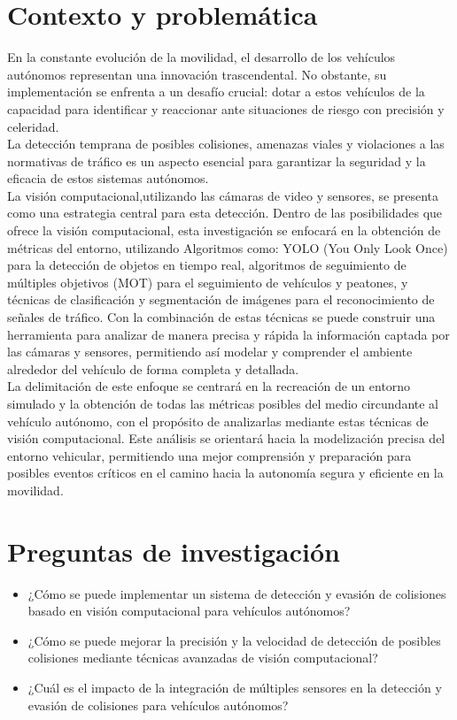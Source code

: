 \documentclass[10pt,letterpaper,final]{article}
\begin{document}
    \section*{Contexto y problemática}
    \noindent En la constante evolución de la movilidad, el desarrollo de los vehículos autónomos representan una innovación trascendental.
    No obstante, su implementación se enfrenta a un desafío crucial: dotar a estos vehículos de la capacidad para identificar
    y reaccionar ante situaciones de riesgo con precisión y celeridad. \\
    La detección temprana de posibles colisiones, amenazas viales y violaciones a las normativas de tráfico
    es un aspecto esencial para garantizar la seguridad y la eficacia de estos sistemas autónomos.\\
    La visión computacional,utilizando las cámaras de video y sensores, se presenta como una estrategia central para esta detección.
    Dentro de las posibilidades que ofrece la visión computacional, esta investigación se enfocará en la obtención de métricas del entorno,
    utilizando Algoritmos como:
    YOLO (You Only Look Once) para la detección de objetos en tiempo real,
    algoritmos de seguimiento de múltiples objetivos (MOT) para el seguimiento de vehículos y peatones, y
    técnicas de clasificación y segmentación de imágenes para el reconocimiento de señales de tráfico.
    Con la combinación de estas técnicas se puede construir una herramienta para analizar de manera precisa y rápida
    la información captada por las cámaras y sensores, permitiendo así modelar y comprender el ambiente alrededor del vehículo de forma completa y detallada.\\
    La delimitación de este enfoque se centrará en la recreación de un entorno simulado y la obtención de todas las métricas posibles
    del medio circundante al vehículo autónomo, con el propósito de analizarlas mediante estas técnicas de visión computacional.
    Este análisis se orientará hacia la modelización precisa del entorno vehicular, permitiendo una mejor comprensión y preparación para posibles
    eventos críticos en el camino hacia la autonomía segura y eficiente en la movilidad.
    \clearpage
    
    \section*{Preguntas de investigación}
    \begin{itemize}
        \item ¿Cómo se puede implementar un sistema de detección y evasión de colisiones basado en visión computacional para vehículos autónomos?
        \item ¿Cómo se puede mejorar la precisión y la velocidad de detección de posibles colisiones mediante técnicas avanzadas de visión computacional?
        \item ¿Cuál es el impacto de la integración de múltiples sensores en la detección y evasión de colisiones para vehículos autónomos?
    \end{itemize}
    
\end{document}
